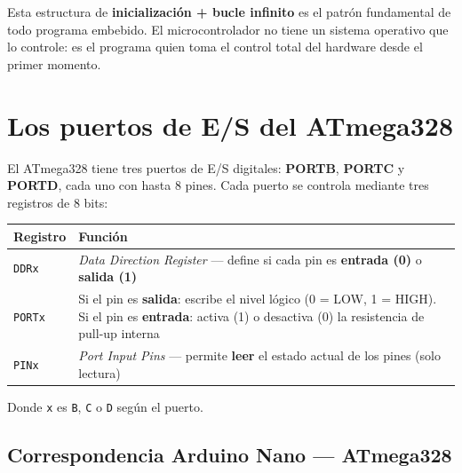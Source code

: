 Esta estructura de \textbf{inicialización + bucle infinito} es el patrón fundamental de
todo programa embebido. El microcontrolador no tiene un sistema operativo que lo
controle: es el programa quien toma el control total del hardware desde el primer
momento.

\section{Los puertos de E/S del ATmega328}

El ATmega328 tiene tres puertos de E/S digitales: \textbf{PORTB}, \textbf{PORTC} y
\textbf{PORTD}, cada uno con hasta 8 pines. Cada puerto se controla mediante tres
registros de 8 bits:

\begin{table}[H]
\centering
\begin{tabular}{lp{10cm}}
\toprule
\textbf{Registro} & \textbf{Función} \\
\midrule
\texttt{DDRx} & \textit{Data Direction Register} --- define si cada pin es
    \textbf{entrada (0)} o \textbf{salida (1)} \\
\texttt{PORTx} & Si el pin es \textbf{salida}: escribe el nivel lógico
    (0 = LOW, 1 = HIGH). Si el pin es \textbf{entrada}: activa (1) o desactiva (0)
    la resistencia de pull-up interna \\
\texttt{PINx} & \textit{Port Input Pins} --- permite \textbf{leer} el estado actual
    de los pines (solo lectura) \\
\bottomrule
\end{tabular}
\end{table}

Donde \texttt{x} es \texttt{B}, \texttt{C} o \texttt{D} según el puerto.


\subsection{Correspondencia Arduino Nano --- ATmega328}

